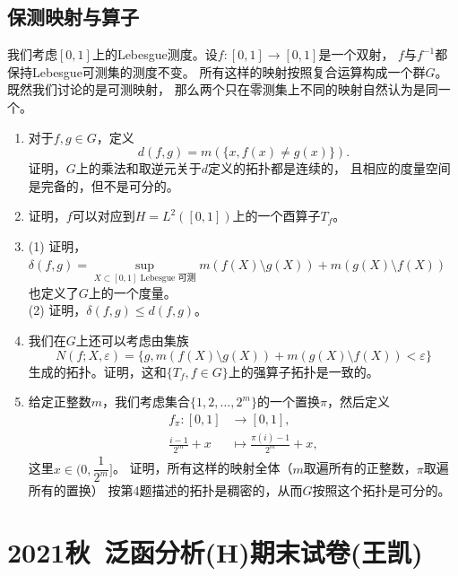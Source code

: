 \subsection*{保测映射与算子}
\qquad 我们考虑$[0,1]$上的Lebesgue测度。设$f:[0,1]\to[0,1]$是一个双射，
$f$与$f^{-1}$都保持Lebesgue可测集的测度不变。
所有这样的映射按照复合运算构成一个群$G$。既然我们讨论的是可测映射，
那么两个只在零测集上不同的映射自然认为是同一个。
\begin{enumerate}
    \item 对于$f,g\in G$，定义
    \[d(f,g)=m(\{x,f(x) \ne g(x)\}).\]
    证明，$G$上的乘法和取逆元关于$d$定义的拓扑都是连续的，
    且相应的度量空间是完备的，但不是可分的。
    \item 证明，$f$可以对应到$H=L^2([0,1])$上的一个酉算子$T_f$。
    \item (1) 证明，$\delta(f,g)=\sup\limits_{X\subset[0,1]\text{ Lebesgue }可测}
    m(f(X) \setminus g(X))+m(g(X) \setminus f(X))$也定义了$G$上的一个度量。\\
    (2) 证明，$\delta(f,g) \leqslant d(f,g)$。
    \item 我们在$G$上还可以考虑由集族
    \[N(f;X,\varepsilon)=\{g,m(f(X) \setminus g(X))+m(g(X) \setminus f(X))<\varepsilon\}\]
    生成的拓扑。证明，这和$\{T_f,f\in G\}$上的强算子拓扑是一致的。
    \item 给定正整数$m$，我们考虑集合$\{1,2,\dots,2^m\}$的一个置换$\pi$，然后定义
    \begin{align*}
        f_\pi:[0,1]&\to[0,1],\\
        \frac{i-1}{2^m}+x&\mapsto\frac{\pi(i)-1}{2^m}+x,
    \end{align*}
    这里$x\in\bigg(0,\dfrac{1}{2^m}\bigg]$。
    证明，所有这样的映射全体（$m$取遍所有的正整数，$\pi$取遍所有的置换）
    按第4题描述的拓扑是稠密的，从而$G$按照这个拓扑是可分的。
\end{enumerate}

\section{2021秋\ 泛函分析(H)期末试卷(王凯)}

